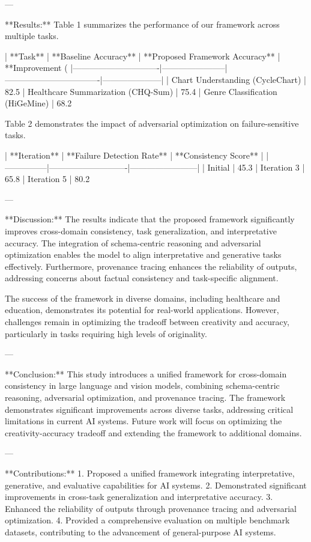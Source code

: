 ---

**Results:**  
Table 1 summarizes the performance of our framework across multiple tasks.

| **Task**                     | **Baseline Accuracy** | **Proposed Framework Accuracy** | **Improvement (%
|-------------------------------|-----------------------|----------------------------------|---------------------|
| Chart Understanding (CycleChart) | 82.5%
| Healthcare Summarization (CHQ-Sum) | 75.4%
| Genre Classification (HiGeMine)  | 68.2%

Table 2 demonstrates the impact of adversarial optimization on failure-sensitive tasks.

| **Iteration** | **Failure Detection Rate** | **Consistency Score** |  
|---------------|----------------------------|------------------------|  
| Initial       | 45.3%
| Iteration 3   | 65.8%
| Iteration 5   | 80.2%

---

**Discussion:**  
The results indicate that the proposed framework significantly improves cross-domain consistency, task generalization, and interpretative accuracy. The integration of schema-centric reasoning and adversarial optimization enables the model to align interpretative and generative tasks effectively. Furthermore, provenance tracing enhances the reliability of outputs, addressing concerns about factual consistency and task-specific alignment.

The success of the framework in diverse domains, including healthcare and education, demonstrates its potential for real-world applications. However, challenges remain in optimizing the tradeoff between creativity and accuracy, particularly in tasks requiring high levels of originality.

---

**Conclusion:**  
This study introduces a unified framework for cross-domain consistency in large language and vision models, combining schema-centric reasoning, adversarial optimization, and provenance tracing. The framework demonstrates significant improvements across diverse tasks, addressing critical limitations in current AI systems. Future work will focus on optimizing the creativity-accuracy tradeoff and extending the framework to additional domains.

---

**Contributions:**  
1. Proposed a unified framework integrating interpretative, generative, and evaluative capabilities for AI systems.  
2. Demonstrated significant improvements in cross-task generalization and interpretative accuracy.  
3. Enhanced the reliability of outputs through provenance tracing and adversarial optimization.  
4. Provided a comprehensive evaluation on multiple benchmark datasets, contributing to the advancement of general-purpose AI systems.  

